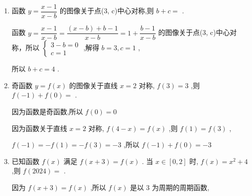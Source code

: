 \begin{enumerate}
\begin{jieda}
        而由 $f\left( x\right)  = {x}^{2} + {mx} = {\left( x + \dfrac{m}{2}\right) }^{2} - \dfrac{{m}^{2}}{4}$ 可知其对称轴为直线 $x =  - \dfrac{m}{2}$ ,故 $- \dfrac{m}{2} = 1$ ,解得 $m =  - 2$ .
    \end{jieda} 
    \item 函数 $y = \dfrac{x - 1}{x - b}$ 的图像关于点(3, c)中心对称,则 $b + c =$ .
    \begin{jieda}
        函数 $y = \dfrac{x - 1}{x - b} = \dfrac{\left( {x - b}\right)  + b - 1}{x - b} = 1 + \dfrac{b - 1}{x - b}$ 的图像关于点(3, c)中心对称，所以 $\left\{  \begin{array}{l} 3 - b = 0 \\  c = 1 \end{array}\right.$ ,解得 $b = 3,c = 1$ ,
        
        所以 $b + c = 4$ .
    \end{jieda}
    \item 奇函数 $y = f\left( x\right)$ 的图像关于直线 $x = 2$ 对称, $f\left( 3\right)  = 3$ ,则 $f\left( {-1}\right)  + f\left( 0\right)  =$ .
    \begin{jieda}
        因为函数是奇函数,所以 $f\left( 0\right)  = 0$
        
        因为函数关于直线 $x = 2$ 对称, $f\left( {4 - x}\right)  = f\left( x\right)$ ,则 $f\left( 1\right)  = f\left( 3\right)$ ,
        
        $f\left( {-1}\right)  =  - f\left( 1\right)  =  - f\left( 3\right)  =  - 3$ ,所以 $f\left( {-1}\right)  + f\left( 0\right)  =  - 3$
    \end{jieda}
    
    \item 已知函数 $f\left( x\right)$ 满足 $f\left( {x + 3}\right)  = f\left( x\right)$ . 当 $x \in  \left\lbrack  {0,2}\right\rbrack$ 时, $f\left( x\right)  = {x}^{2} + 4$ ,则 $f\left( {2024}\right)  =$ .
    \begin{jieda}
        因为 $f\left( {x + 3}\right)  = f\left( x\right)$ ,所以 $f\left( x\right)$ 是以 3 为周期的周期函数,
        

\end{jieda}
\end{enumerate}
